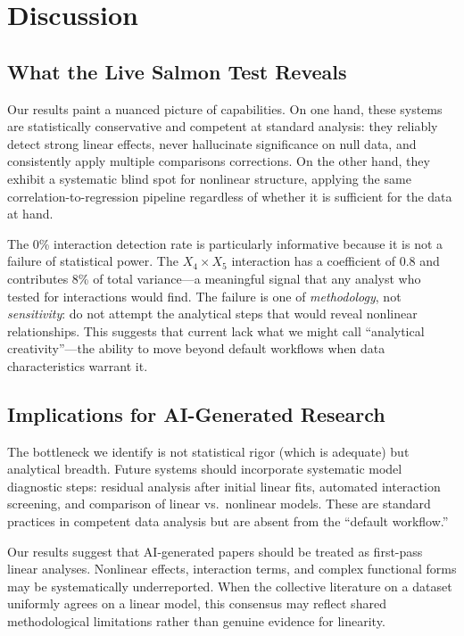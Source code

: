 \section{Discussion}
\label{sec:discussion}

\subsection{What the Live Salmon Test Reveals}
\label{sec:interpretation}

Our results paint a nuanced picture of \aiscientist capabilities.
On one hand, these systems are statistically conservative and competent at standard analysis: they reliably detect strong linear effects, never hallucinate significance on null data, and consistently apply multiple comparisons corrections.
On the other hand, they exhibit a systematic blind spot for nonlinear structure, applying the same correlation-to-regression pipeline regardless of whether it is sufficient for the data at hand.

The 0\% interaction detection rate is particularly informative because it is not a failure of statistical power.
The $X_4 \times X_5$ interaction has a coefficient of 0.8 and contributes 8\% of total variance---a meaningful signal that any analyst who tested for interactions would find.
The failure is one of \textit{methodology}, not \textit{sensitivity}: \aiscientists do not attempt the analytical steps that would reveal nonlinear relationships.
This suggests that current \llms lack what we might call ``analytical creativity''---the ability to move beyond default workflows when data characteristics warrant it.

\subsection{Implications for AI-Generated Research}
\label{sec:implications}

The bottleneck we identify is not statistical rigor (which is adequate) but analytical breadth.
Future systems should incorporate systematic model diagnostic steps: residual analysis after initial linear fits, automated interaction screening, and comparison of linear vs.\ nonlinear models.
These are standard practices in competent data analysis but are absent from the \llm ``default workflow.''

Our results suggest that AI-generated papers should be treated as first-pass linear analyses.
Nonlinear effects, interaction terms, and complex functional forms may be systematically underreported.
When the collective \aiscientist literature on a dataset uniformly agrees on a linear model, this consensus may reflect shared methodological limitations rather than genuine evidence for linearity.

